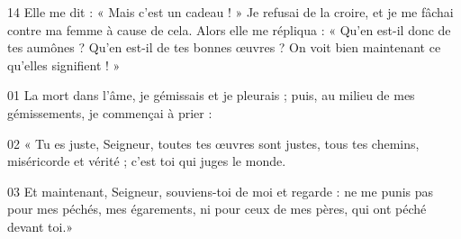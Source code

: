 14 Elle me dit : « Mais c’est un cadeau ! » Je refusai de la croire, et je me fâchai contre ma femme à cause de cela. Alors elle me répliqua : « Qu’en est-il donc de tes aumônes ? Qu’en est-il de tes bonnes œuvres ? On voit bien maintenant ce qu’elles signifient ! »

01 La mort dans l’âme, je gémissais et je pleurais ; puis, au milieu de mes gémissements, je commençai à prier :

02 « Tu es juste, Seigneur, toutes tes œuvres sont justes, tous tes chemins, miséricorde et vérité ; c’est toi qui juges le monde.

03 Et maintenant, Seigneur, souviens-toi de moi et regarde : ne me punis pas pour mes péchés, mes égarements, ni pour ceux de mes pères, qui ont péché devant toi.»